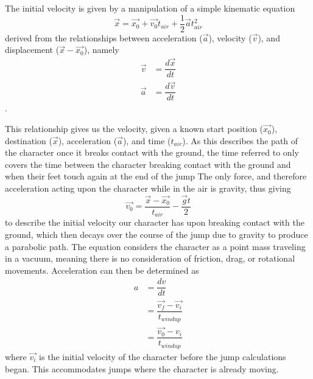 The initial velocity is given by a manipulation of a simple kinematic equation \[ \vec{x} = \vec{x_0} + \vec{v_0} t_{air} + \frac{1}{2} \vec{a} t_{air}^2 \] derived from the relationships between acceleration ($\vec{a}$), velocity ($\vec{v}$), and displacement ($\vec{x} - \vec{x_0}$), namely
\begin{align*}
	\vec{v} &= \dfrac{d\vec{x}}{dt} \\
	\vec{a} &= \dfrac{d\vec{v}}{dt}
\end{align*}.

This relationship gives us the velocity, given a known start position ($\vec{x_0}$), destination ($\vec{x}$), acceleration ($\vec{a}$), and time ($t_{air}$).  As this describes the path of the character once it breaks contact with the ground, the time referred to only covers the time between the character breaking contact with the ground and when their feet touch again at the end of the jump  The only force, and therefore acceleration acting upon the character while in the air is gravity, thus giving 
\[ \vec{v_0} = \dfrac{\vec{x} - \vec{x_0}}{t_{air}} - \dfrac{\vec{g}t}{2} \]
to describe the initial velocity our character has upon breaking contact with the ground, which then decays over the course of the jump due to gravity to produce a parabolic path.  The equation considers the character as a point mass traveling in a vacuum, meaning there is no consideration of friction, drag, or rotational movements.  Acceleration can then be determined as 
\begin{align*}
	a &= \dfrac{dv}{dt} \\
	&= \dfrac{\vec{v_f} - \vec{v_i}}{t_{windup}} \\
	&= \dfrac{\vec{v_0} - {v_i}}{t_{windup}}
\end{align*}
where $\vec{v_i}$ is the initial velocity of the character before the jump calculations began.  This accommodates jumps where the character is already moving.


